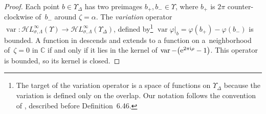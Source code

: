 \documentclass[10pt,a4paper]{amsart}
\newcommand{\singexp}[2]{\mathcal{H}L^\infty_{#1, #2}}
\newcommand{\maps}{\colon}
\newcommand{\C}{\mathbb{C}}
\DeclareMathOperator{\var}{var}
\numberwithin{equation}{section}
\begin{document}
\begin{proof}
Each point $b \in \Upsilon_\Delta$ has two preimages $b_+, b_- \in \Upsilon$, where $b_+$ is $2\pi$ counter-clockwise of~$b_-$ around $\zeta = \alpha$. The {\em variation} operator $\var \maps \singexp{\sigma}{\Lambda}(\Upsilon) \to \singexp{\sigma}{\Lambda}(\Upsilon_\Delta)$, defined by\footnote{The target of the variation operator is a space of functions on $\Upsilon_\Delta$ because the variation is defined only on the overlap. Our notation follows the convention of \cite{diverg-resurg-i}, described before Definition~6.46.}
$\var \varphi \big|_b = \varphi(b_+) - \varphi(b_-) $
is bounded. A function in \smash{$\singexp{\sigma}{\Lambda}(\Upsilon)$} descends and extends to a function on a~neighborhood of~${\zeta = 0}$ in $\C$ if and only if it lies in the kernel of $\var - \bigl({\rm e}^{2 \pi {\rm i} \rho} - 1\bigr)$. This operator is bounded, so its kernel is closed.
\end{proof}
\end{document}
